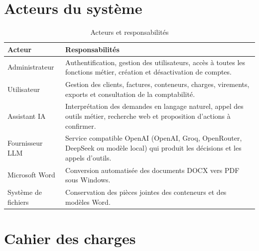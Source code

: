 \documentclass[12pt,a4paper,oneside]{report}
\begin{document}
\section{Acteurs du système}
\begin{table}[H]\centering
\caption{Acteurs et responsabilités}
\begin{tabularx}{\textwidth}{p{3cm}Y}
\toprule
\textbf{Acteur} & \textbf{Responsabilités}\\
\midrule
Administrateur & Authentification, gestion des utilisateurs, accès à toutes les fonctions métier, création et désactivation de comptes.\\
Utilisateur & Gestion des clients, factures, conteneurs, charges, virements, exports et consultation de la comptabilité.\\
Assistant IA & Interprétation des demandes en langage naturel, appel des outils métier, recherche web et proposition d'actions à confirmer.\\
Fournisseur LLM & Service compatible OpenAI (OpenAI, Groq, OpenRouter, DeepSeek ou modèle local) qui produit les décisions et les appels d'outils.\\
Microsoft Word & Conversion automatisée des documents DOCX vers PDF sous Windows.\\
Système de fichiers & Conservation des pièces jointes des conteneurs et des modèles Word.\\
\bottomrule
\end{tabularx}
\end{table}

\section{Cahier des charges}
\end{document}
